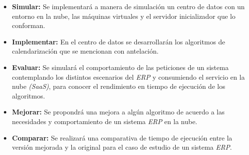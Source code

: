 \begin{itemize}
	\item \textbf{Simular:} Se implementar\'a a manera de simulaci\'on un centro de datos con un entorno en la nube, las m\'aquinas virtuales y el servidor inicializador que lo conforman.
	\item \textbf{Implementar:} En el centro de datos se desarrollar\'an los algoritmos de calendarizaci\'on que se mencionan con antelaci\'on.
	\item \textbf{Evaluar:} Se simular\'a el comportamiento de las peticiones de un sistema contemplando los distintos escenarios del \textit{ERP} y consumiendo el servicio en la nube \textit{(SaaS)}, para conocer el rendimiento en tiempo de ejecuci\'on de los algoritmos.
	\item \textbf{Mejorar:} Se propondr\'a una mejora a alg\'un algoritmo de acuerdo a las necesidades y comportamiento de un sistema \textit{ERP} en la nube.
	\item \textbf{Comparar:} Se realizar\'a una comparativa de tiempo de ejecuci\'on entre la versi\'on mejorada y la original para el caso de estudio de un sistema \textit{ERP}.
\end{itemize}




